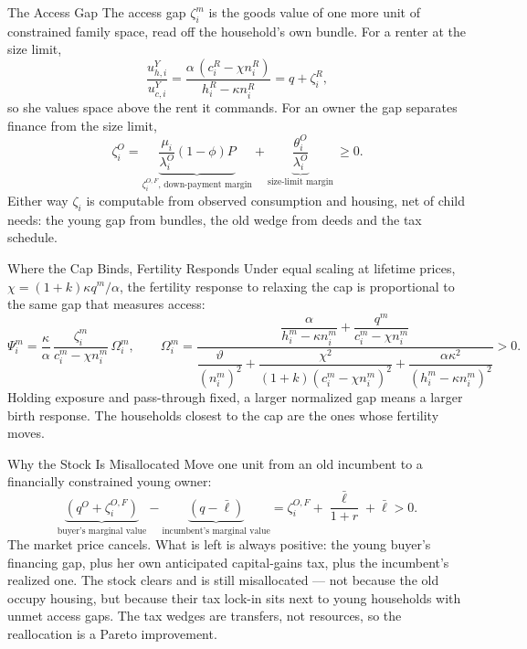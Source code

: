 \documentclass[aspectratio=169,10pt]{beamer}
\providecommand{\1}{\mathbf 1}
\begin{document}
\begin{frame}{The Access Gap}
  The access gap $\zeta_i^m$ is the goods value of one more unit of constrained family space, read off the household's own bundle. For a renter at the size limit,
  \[
  \frac{u^Y_{h,i}}{u^Y_{c,i}}=\frac{\alpha\,(c_i^R-\chi n_i^R)}{h_i^R-\kappa n_i^R}=q+\zeta_i^R,
  \]
  so she values space above the rent it commands. For an owner the gap separates finance from the size limit,
  \[
  \zeta_i^O=\underbrace{\frac{\mu_i}{\lambda_i^O}(1-\phi)P}_{\zeta_i^{O,F}\text{, down-payment margin}}+\underbrace{\frac{\theta_i^O}{\lambda_i^O}}_{\text{size-limit margin}}\ \ge0.
  \]
  Either way $\zeta_i$ is computable from observed consumption and housing, net of child needs: the young gap from bundles, the old wedge from deeds and the tax schedule.
\end{frame}

\begin{frame}{Where the Cap Binds, Fertility Responds}
  Under equal scaling at lifetime prices, $\chi=(1+k)\kappa q^m/\alpha$, the fertility response to relaxing the cap is proportional to the same gap that measures access:
  \[
  \Psi_i^m=\frac{\kappa}{\alpha}\,\frac{\zeta_i^m}{c_i^m-\chi n_i^m}\,\Omega_i^m,
  \qquad
  \Omega_i^m=\frac{\dfrac{\alpha}{h_i^m-\kappa n_i^m}+\dfrac{q^m}{c_i^m-\chi n_i^m}}{\dfrac{\vartheta}{(n_i^m)^2}+\dfrac{\chi^2}{(1+k)(c_i^m-\chi n_i^m)^2}+\dfrac{\alpha\kappa^2}{(h_i^m-\kappa n_i^m)^2}}>0.
  \]
  Holding exposure and pass-through fixed, a larger normalized gap means a larger birth response. The households closest to the cap are the ones whose fertility moves.
\end{frame}

\begin{frame}{Why the Stock Is Misallocated}
  Move one unit from an old incumbent to a financially constrained young owner:
  \[
  \underbrace{\left(q^O+\zeta_i^{O,F}\right)}_{\text{buyer's marginal value}}
  -\underbrace{\left(q-\bar\ell\right)}_{\text{incumbent's marginal value}}
  =
  \zeta_i^{O,F}+\frac{\bar\ell}{1+r}+\bar\ell>0 .
  \]
  The market price cancels. What is left is always positive: the young buyer's financing gap, plus her own anticipated capital-gains tax, plus the incumbent's realized one. The stock clears and is still misallocated --- not because the old occupy housing, but because their tax lock-in sits next to young households with unmet access gaps. The tax wedges are transfers, not resources, so the reallocation is a Pareto improvement.
\end{frame}
\end{document}
